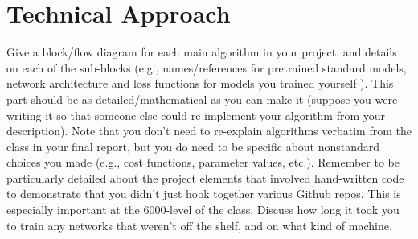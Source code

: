 \documentclass[conference]{IEEEtran}
\begin{document}
\section{Technical Approach}
\begin{tcolorbox}
Give a block/flow diagram for each main algorithm in your project, and details on each of the sub-blocks (e.g., names/references for pretrained standard models, network architecture and loss functions for models you trained yourself ). This part should be as detailed/mathematical as you can make it (suppose you were writing it so that someone else could re-implement your algorithm from your description). Note that you don’t need to re-explain algorithms verbatim from the class in your final report, but you do need to be specific about nonstandard choices you made (e.g., cost functions, parameter values, etc.). Remember to be particularly detailed about the project elements that involved hand-written code to demonstrate that you didn’t just hook together various Github repos. This is especially important at the 6000-level of the class. Discuss how long it took you to train any networks that weren’t off the shelf, and on what kind of machine.
\end{tcolorbox}



\end{document}
